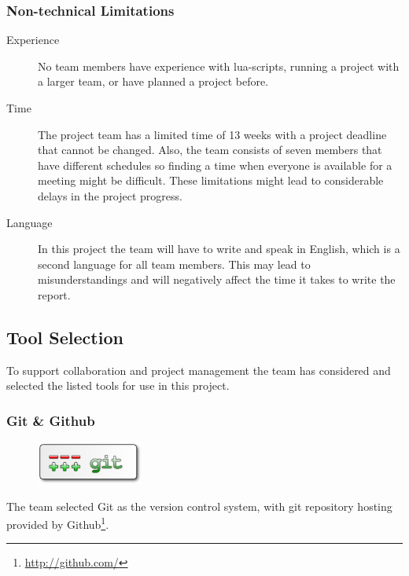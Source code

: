 \subsubsection{Non-technical Limitations}
\begin{description}
	\item[Experience] No team members have experience with \Gls{lua}-\glspl{script},
		running a project with a larger team, or have planned a project before.
	\item[Time] The project team has a limited time of 13 weeks with a project
		deadline that cannot be changed. Also, the team consists of seven members
		that have different schedules so finding a time when everyone is
		available for a meeting might be difficult. These limitations might
		lead to considerable delays in the project progress.
	\item[Language] In this project the team will have to write and speak in
		English, which is a second language for all team members. This may
		lead to misunderstandings and will negatively affect the time it
		takes to write the report.
\end{description}

\subsection{Tool Selection}
To support collaboration and project management the team has considered and
selected the listed tools for use in this project.

\subsubsection{Git \& Github}
\begin{figure}
	\vspace{-20pt}
	\includegraphics[width=3.5cm]{./planning/img/git_logo}
	\vspace{-20pt}
\end{figure}
The team selected Git as the \gls{version control system}, with git \gls{repository}
hosting provided by Github\footnote{\url{http://github.com/}}.

